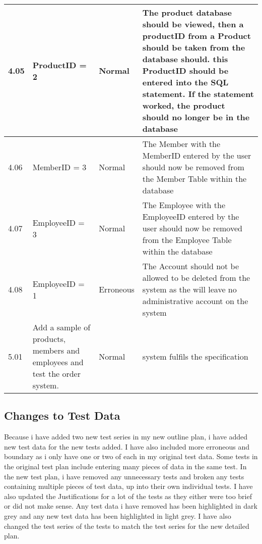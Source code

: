 \begin{flushleft}
\begin{longtable}{|p{1.5cm}|p{2.5cm}|p{2cm}|p{4.5cm}|}
	4.05 & ProductID = 2 & Normal & The product database should be viewed, then a productID from a Product should be taken from the database should. this ProductID should be entered into the SQL statement. If the statement worked, the product should no longer be in the database\\ \hline
	4.06 & MemberID = 3 & Normal & The Member with the MemberID entered by the user should now be removed from the Member Table within the database \\ \hline
	4.07 & EmployeeID = 3 & Normal & The Employee with the EmployeeID entered by the user should now be removed from the Employee Table within the database \\ \hline
	4.08 &  EmployeeID = 1 & Erroneous & The Account should not be allowed to be deleted from the system as the will leave no administrative account on the system \\ \hline
	5.01 &  Add a sample of products, members and employees and test the order system.  & Normal &system fulfils the specification \\ \hline
    \end{longtable}
\end{flushleft}

\subsection{Changes to Test Data}
	
Because i have added two new test series in my new outline plan, i have added new test data for the new tests added. I have also included more erroneous and boundary as i only have one or two of each in my original test data. Some tests in the original test plan include entering many pieces of data in the same test. In the new test plan, i have removed any unnecessary tests and broken any tests containing multiple pieces of test data, up into their own individual tests. I have also updated the Justifications for a lot of the tests as they either were too brief or did not make sense. Any test data i have removed has been highlighted in dark grey and any new test data has been highlighted in light grey. I have also changed the test series of the tests to match the test series for the new detailed plan.

